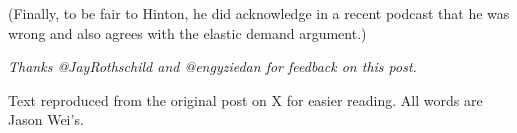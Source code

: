 \documentclass[11pt]{article}
\begin{document}
(Finally, to be fair to Hinton, he did acknowledge in a recent podcast that he was wrong and also agrees with the elastic demand argument.)

\textit{Thanks @JayRothschild and @engyziedan for feedback on this post.}

\vfill
\begin{center}\footnotesize
Text reproduced from the original post on X for easier reading. All words are Jason Wei's.
\end{center}
\end{document}
